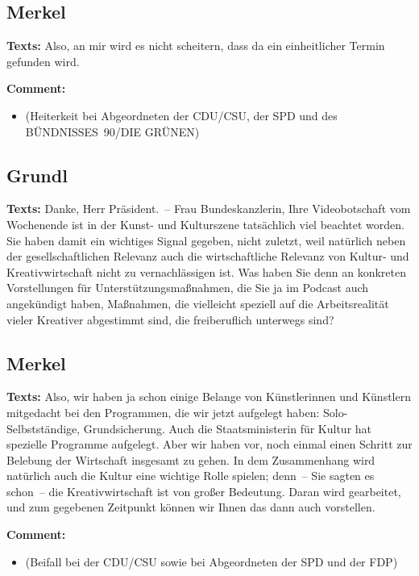 \documentclass{article}
\begin{document}
\subsection{Merkel}
\noindent\textbf{Texts:} Also, an mir wird es nicht scheitern, dass da ein einheitlicher Termin gefunden wird. 

\noindent\textbf{Comment:}
\begin{itemize}
    \setlength\itemsep{-3pt}
    \item (Heiterkeit bei Abgeordneten der CDU/CSU, der SPD und des BÜNDNISSES 90/DIE GRÜNEN)
\end{itemize}
\subsection{Grundl}
\noindent\textbf{Texts:} Danke, Herr Präsident. – Frau Bundeskanzlerin, Ihre Videobotschaft vom Wochenende ist in der Kunst- und Kulturszene tatsächlich viel beachtet worden. Sie haben damit ein wichtiges Signal gegeben, nicht zuletzt, weil natürlich neben der gesellschaftlichen Relevanz auch die wirtschaftliche Relevanz von Kultur- und Kreativwirtschaft nicht zu vernachlässigen ist. Was haben Sie denn an konkreten Vorstellungen für Unterstützungsmaßnahmen, die Sie ja im Podcast auch angekündigt haben, Maßnahmen, die vielleicht speziell auf die Arbeitsrealität vieler Kreativer abgestimmt sind, die freiberuflich unterwegs sind?

\subsection{Merkel}
\noindent\textbf{Texts:} Also, wir haben ja schon einige Belange von Künstlerinnen und Künstlern mitgedacht bei den Programmen, die wir jetzt aufgelegt haben: Solo-Selbstständige, Grundsicherung. Auch die Staatsministerin für Kultur hat spezielle Programme aufgelegt. Aber wir haben vor, noch einmal einen Schritt zur Belebung der Wirtschaft insgesamt zu gehen. In dem Zusammenhang wird natürlich auch die Kultur eine wichtige Rolle spielen; denn – Sie sagten es schon – die Kreativwirtschaft ist von großer Bedeutung. Daran wird gearbeitet, und zum gegebenen Zeitpunkt können wir Ihnen das dann auch vorstellen. 

\noindent\textbf{Comment:}
\begin{itemize}
    \setlength\itemsep{-3pt}
    \item (Beifall bei der CDU/CSU sowie bei Abgeordneten der SPD und der FDP)
\end{itemize}
\end{document}
